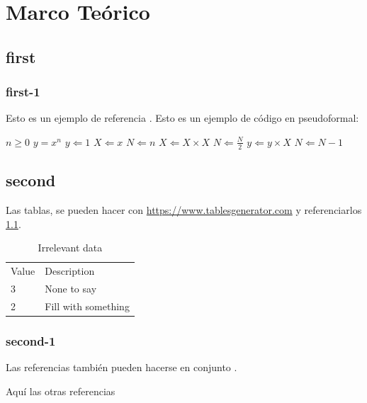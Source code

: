 \chapter{Marco Te\'orico}

\section{first}

\subsection{first-1}
Esto es un ejemplo de referencia \cite{STRO01}. Esto es un ejemplo de c\'odigo en pseudoformal:


\begin{algorithmic}[upquote=true, language=pseudo]
	\Require $n \geq 0$
	\Ensure $y = x^n$
	\State $y \Leftarrow 1$
	\State $X \Leftarrow x$
	\State $N \Leftarrow n$
	\State $X \Leftarrow X \times X$
	\State $N \Leftarrow \frac{N}{2} $  
	\State $y \Leftarrow y \times X$
	\State $N \Leftarrow N - 1$
	\EndIf
	\EndWhile
\end{algorithmic}
\section{second}

Las tablas, se pueden hacer con \url{https://www.tablesgenerator.com} y referenciarlos \ref{lb:table1}.

\begin{table}[htpb!]
	\centering
	\begin{tabular}{ll}
		Value & Description         \\
		3     & None to say         \\
		2     & Fill with something
	\end{tabular}
	\caption{Irrelevant data}
	\label{lb:table1}
\end{table}

\subsection{second-1}
Las referencias tambi\'en pueden hacerse en conjunto \cite{REF_MIC,WEB99}.



\noindent Aqu\'i las otras referencias \cite{RAM11}

